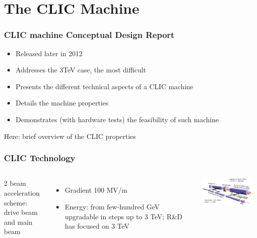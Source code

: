 \documentclass{beamer}
\begin{document}
\section[CLIC]{The CLIC Machine}
\begin{frame}
\frametitle{CLIC machine Conceptual Design Report}
\begin{itemize}
  \item Released later in 2012
  \item Addresses the 3TeV case, the most difficult
  \item Presents the different technical aspects of a CLIC machine
  \item Details the machine properties
  \item Demonstrates (with hardware tests) the feasibility of such machine
\end{itemize}
Here: brief overview of the CLIC properties
\end{frame}
\begin{frame}
\frametitle{CLIC Technology}
\begin{columns}[c]
\column{6cm}
2 beam acceleration scheme:\\ drive beam and main beam
\begin{itemize}
  \item Gradient 100 MV/m
  \item Energy: from few-hundred GeV upgradable in steps up to 3 TeV; R\&D has
  focused on 3 TeV
\end{itemize}
\column{6cm}
\includegraphics[width=6cm]{clicacceleration.png}
\end{columns}
\end{frame}
\end{document}
